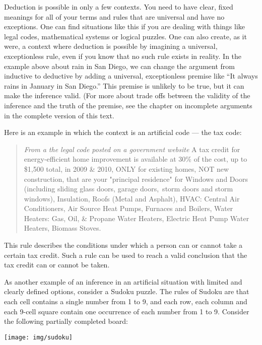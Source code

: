 Deduction is possible in only a few contexts. You need to have clear, fixed meanings for all of your terms and rules that are universal and have no exceptions.   One can find situations like this if you are dealing with things like legal codes, mathematical systems or logical puzzles. One can also create, as it were, a context where deduction is possible by imagining a universal, exceptionless rule, even if you know that no such rule exists in reality. In the example above about rain in San Diego, we can change the argument from inductive to deductive by adding a universal, exceptionless premise like ``It always rains in January in San Diego.'' This premise is unlikely to be true, but it can make the inference valid. (For more about trade offs between the validity of the inference and the truth of the premise, see the chapter on incomplete arguments in the complete version of this text. \label{ver_var} 

Here is an example in which the context is an artificial code --- the tax code:

\begin{quotation} \noindent\textit{From a the legal code posted on a government website} A tax credit for energy-efficient home improvement is available at 30\% of the cost, up to \$1,500 total, in 2009 \& 2010, ONLY for existing homes, NOT new construction, that are your "principal residence" for Windows and Doors (including sliding glass doors, garage doors,~storm doors and storm windows), Insulation, Roofs (Metal and Asphalt), HVAC: Central Air Conditioners, Air Source Heat Pumps, Furnaces and Boilers, Water Heaters: Gas, Oil, \& Propane Water Heaters, Electric Heat Pump Water Heaters, Biomass Stoves. \end{quotation}

This rule describes the conditions under which a person can or cannot take a certain tax credit. Such a rule can be used to reach a valid conclusion that the tax credit can or cannot be taken.

As another example of an inference in an artificial situation with limited and clearly defined options, consider a Sudoku puzzle. The rules of Sudoku are that each cell contains a single number from 1 to 9, and each row, each column and each 9-cell square contain one occurrence of each number from 1 to 9. Consider the following partially completed board:

\begin{center}
\noindent \texttt{[image: img/sudoku]}
\end{center}

